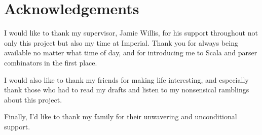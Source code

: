 \documentclass[../../main.tex]{subfiles}
\begin{document}
\hspace{0pt}
\vfill
\section*{\centering Acknowledgements}
\noindent
I would like to thank my supervisor, Jamie Willis, for his support throughout not only this project but also my time at Imperial.
Thank you for always being available no matter what time of day, and for introducing me to Scala and parser combinators in the first place.
\newline

\noindent
I would also like to thank my friends for making life interesting, and especially thank those who had to read my drafts and listen to my nonsensical ramblings about this project.
\newline

\noindent
Finally, I'd like to thank my family for their unwavering and unconditional support.
\vfill
\hspace{0pt}
\end{document}
